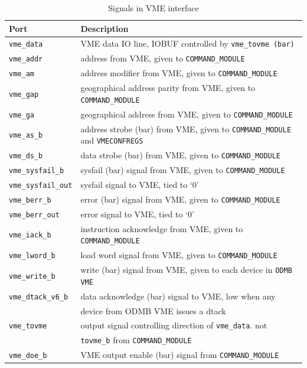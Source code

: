\documentclass[10pt,a4paper]{article}
\begin{document}
\begin{table}[H]
\begin{tabular}{|l|l|} \hline
Port& Description\\ \hline
\texttt{vme\_data}& VME data IO line, IOBUF controlled by \texttt{vme\_tovme (bar)}\\ \hline
\texttt{vme\_addr}& address from VME, given to \texttt{COMMAND\_MODULE}\\ \hline
\texttt{vme\_am}& address modifier from VME, given to \texttt{COMMAND\_MODULE}\\ \hline
\texttt{vme\_gap}& geographical address parity from VME, given to \texttt{COMMAND\_MODULE}\\ \hline
\texttt{vme\_ga}& geographical address from VME, given to \texttt{COMMAND\_MODULE}\\ \hline
\texttt{vme\_as\_b}& address strobe (bar) from VME, given to \texttt{COMMAND\_MODULE} and \texttt{VMECONFREGS}\\ \hline
\texttt{vme\_ds\_b}& data strobe (bar) from VME, given to \texttt{COMMAND\_MODULE}\\ \hline
\texttt{vme\_sysfail\_b}& sysfail (bar) signal from VME, given to \texttt{COMMAND\_MODULE}\\ \hline
\texttt{vme\_sysfail\_out}& sysfail signal to VME, tied to `0'\\ \hline
\texttt{vme\_berr\_b}& error (bar) signal from VME, given to \texttt{COMMAND\_MODULE}\\ \hline
\texttt{vme\_berr\_out}& error signal to VME, tied to `0'\\ \hline
\texttt{vme\_iack\_b}& instruction acknowledge from VME, given to \texttt{COMMAND\_MODULE}\\ \hline
\texttt{vme\_lword\_b}& load word signal from VME, given to \texttt{COMMAND\_MODULE}\\ \hline
\texttt{vme\_write\_b}& write (bar) signal from VME, given to each device in \texttt{ODMB VME}\\ \hline
\texttt{vme\_dtack\_v6\_b}& data acknowledge (bar) signal to VME, low when any \\
                 & device from ODMB VME issues a dtack\\ \hline
\texttt{vme\_tovme}& output signal controlling direction of \texttt{vme\_data}. not \\
          & \texttt{tovme\_b} from \texttt{COMMAND\_MODULE}\\ \hline
\texttt{vme\_doe\_b}& VME output enable (bar) signal from \texttt{COMMAND\_MODULE}\\ \hline
\end{tabular}
\caption{Signals in VME interface}
\label{tab:vmeinterface}
\end{table}
\end{document}
